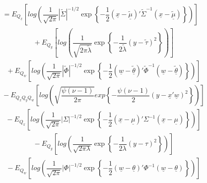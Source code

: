 \documentclass[fleqn]{minimal}
\begin{document}
\begin{align*}
  \ \ \ \ \ \
  = 
  E_{Q_{\underline{x}}}
  \left[
    log \left(
      \dfrac{1}{\sqrt{2\pi}}
      \left| \tilde{\Sigma} \right|^{-1/2}
      \exp
      \left\{
        - \dfrac{1}{2}
        \left( \underline{x} - \underline{\tilde{\mu}}\right)'
        \tilde{\Sigma}^{-1}
        \left( \underline{x} - \underline{\tilde{\mu}}\right)
      \right\}
    \right)
  \right]
\end{align*}
\begin{align*}
  \ \ \ \ \ \ \ \ \ \
  + 
  E_{Q_{y}}
  \left[
    log \left(
      \dfrac{1}{\sqrt{2\pi\tilde{\lambda}}}
      \exp
      \left\{
        - \dfrac{1}{2\tilde{\lambda}}
        \left(y - \tilde{\tau}\right)^2
      \right\}
    \right)
  \right]
\end{align*}
\begin{align*}
  \ \ \ \ \ \ \ \ \ \
  +
  E_{Q_{\underline{w}}}
  \left[
    log \left(
      \dfrac{1}{\sqrt{2\pi}}
      \left| \tilde{\Phi} \right|^{-1/2}
      \exp
      \left\{
        - \dfrac{1}{2}
        \left( \underline{w} - \underline{\tilde{\theta}}\right)'
        \tilde{\Phi}^{-1}
        \left( \underline{w} - \underline{\tilde{\theta}}\right)
      \right\}
    \right)
  \right]
\end{align*}
\begin{align*}
  \ \ \ \ \ \ \ \ \ \
  - E_{Q_{\underline{x}} Q_{y} Q_{\underline{w}}}
  \left[
    log \left(
      \sqrt{\dfrac{\psi\left(\nu-1\right)}{2\pi}}
      exp
      \left\{
        -\dfrac{\psi\left(\nu-1\right)}{2}
        \left( y - \underline{x}'\underline{w}\right)^2
      \right\}
    \right)
  \right]
\end{align*}
\begin{align*}
  \ \ \ \ \ \ \ \ \ \
  - E_{Q_{\underline{x}} }
  \left[
    log \left(
      \dfrac{1}{\sqrt{2\pi}}
      \left| \Sigma \right|^{-1/2}
      \exp
      \left\{
        - \dfrac{1}{2}
        \left( \underline{x} - \underline{\mu}\right)'
        \Sigma^{-1}
        \left( \underline{x} - \underline{\mu}\right)
      \right\}
    \right)
  \right]
\end{align*}
\begin{align*}
  \ \ \ \ \ \ \ \ \ \
  - E_{Q_{y}}
  \left[
    log \left(
      \dfrac{1}{\sqrt{2\pi\lambda}}
      \exp
      \left\{
        - \dfrac{1}{2\lambda}
        \left(y - \tau\right)^2
      \right\}
    \right)
  \right]
\end{align*}
\begin{align*}
  \ \ \ \ \ \ \ \ \ \
   - E_{Q_{\underline{w}}}
  \left[
    log \left(
      \dfrac{1}{\sqrt{2\pi}}
      \left| \Phi \right|^{-1/2}
      \exp
      \left\{
        - \dfrac{1}{2}
        \left( \underline{w} - \underline{\theta}\right)'
        \Phi^{-1}
        \left( \underline{w} - \underline{\theta}\right)
      \right\}
    \right)
  \right]
\end{align*}
\end{document}
